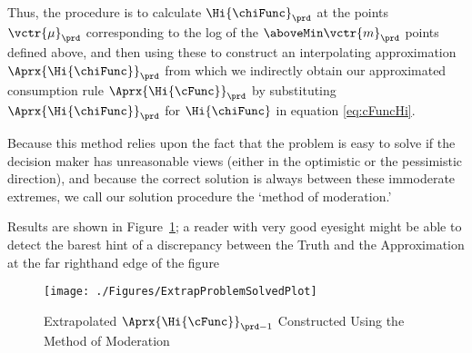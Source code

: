   Thus, the procedure is to calculate $\Hi{\chiFunc}_{\prd}$ at the points
  $\vctr{\mu}_{\prd}$ corresponding to the log of the $\aboveMin
  \vctr{m}_{\prd}$ points defined above, and then using these to construct an
  interpolating approximation $\Aprx{\Hi{\chiFunc}}_{\prd}$ from which we indirectly obtain our
  approximated consumption rule $\Aprx{\Hi{\cFunc}}_{\prd}$ by substituting $\Aprx{\Hi{\chiFunc}}_{\prd}$ for $\Hi{\chiFunc}$ in equation \eqref{eq:cFuncHi}.

  Because this method relies upon the fact that the problem is easy to
  solve if the decision maker has unreasonable views (either in the
  optimistic or the pessimistic direction), and because the correct
  solution is always between these immoderate extremes, we call our
  solution procedure the `method of moderation.'

  Results are shown in Figure~\ref{fig:ExtrapProblemSolved}; a reader
  with very good eyesight might be able to detect the barest hint of a
  discrepancy between the Truth and the Approximation at the far
  righthand edge of the figure
  \hypertarget{ExtrapProblemSolvedPlot}{}
  \begin{figure}
    \texttt{[image: ./Figures/ExtrapProblemSolvedPlot]}
    \caption{Extrapolated $\Aprx{\Hi{\cFunc}}_{\prd-1}$ Constructed Using the Method of Moderation}
    \label{fig:ExtrapProblemSolved}
  \end{figure}
